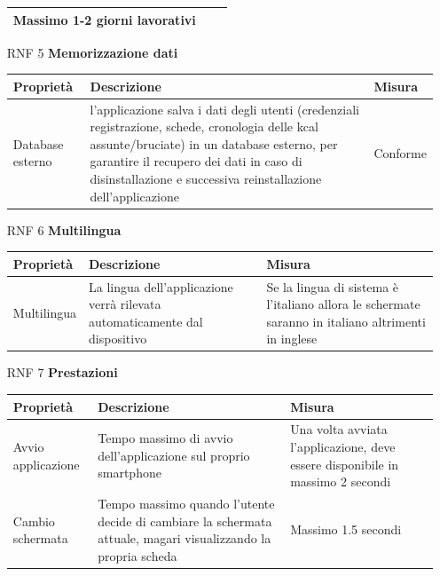 \documentclass{article}
\begin{document}
\begin{itemize}
\begin{tabular}{|p{5cm}|p{11cm}|p{2cm}|}
                     Massimo 1-2 giorni lavorativi\\
                     \hline
                 \end{tabular}
   \item [RNF 5] \textbf{Memorizzazione dati}\\
                 \begin{tabular}{|p{5cm}|p{11cm}|p{2cm}|}
                     \hline
                     Proprietà & Descrizione & Misura\\
                     \hline
                     Database esterno&l’applicazione salva i dati degli utenti (credenziali registrazione, schede, cronologia delle kcal assunte/bruciate) in un database esterno, per garantire il recupero dei dati in caso di disinstallazione e successiva reinstallazione dell’applicazione&Conforme\\
                     \hline
                 \end{tabular}
   \item [RNF 6] \textbf{Multilingua}\\
                 \begin{tabular}{|p{5cm}|p{8cm}|p{5cm}|}
                     \hline
                     Proprietà & Descrizione & Misura\\
                     \hline
                     Multilingua & La lingua dell’applicazione verrà rilevata automaticamente dal dispositivo & Se la lingua di sistema è l’italiano allora le schermate saranno in italiano altrimenti in inglese\\
                     \hline
                 \end{tabular}
   \item [RNF 7] \textbf{Prestazioni}\\
                 \begin{tabular}{|p{5cm}|p{10cm}|p{3cm}|}
                     \hline
                     Proprietà & Descrizione & Misura\\
                     \hline
                     Avvio applicazione & Tempo massimo di avvio dell’applicazione sul proprio smartphone & Una volta avviata l’applicazione, deve essere disponibile in
                     massimo 2 secondi\\
                     \hline
                     Cambio schermata & Tempo massimo quando l’utente decide di cambiare la schermata attuale, magari visualizzando la propria scheda &
                     Massimo 1.5 secondi\\

\end{tabular}
\end{itemize}
\end{document}
